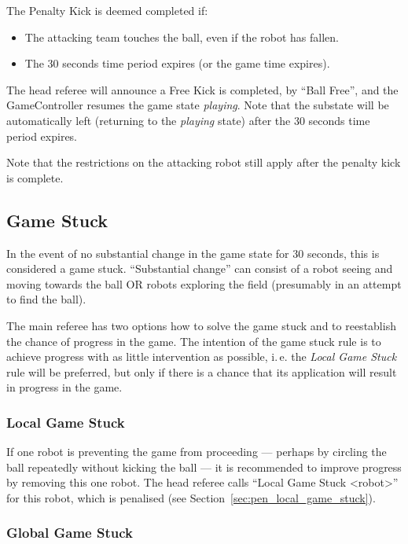 \documentclass[12pt]{article}
\newcommand{\ie}{\mbox{i.\,e.}\xspace}
\newcommand{\cf}{see\xspace}
\newcommand{\PenaltyFreeKickTime}{30 seconds\xspace}
\begin{document}
The Penalty Kick is deemed completed if:
\begin{itemize}
\item The attacking team touches the ball, even if the robot has fallen.
\item The \PenaltyFreeKickTime time period expires (or the game time expires).
\end{itemize}

The head referee will announce a Free Kick is completed, by ``Ball Free'', and the GameController
resumes the game state \emph{playing}. Note that the substate will be automatically left (returning to the \textit{playing} state) after the \PenaltyFreeKickTime time period expires.

Note that the restrictions on the attacking robot still apply after the penalty kick is complete.

\subsection{Game Stuck}
\label{sec:game_stuck}

In the event of no substantial change in the game state for 30 seconds, this is considered a game stuck.  ``Substantial change'' can consist of a robot seeing and moving towards the ball OR robots exploring the field (presumably in an attempt to find the ball).

The main referee has two options how to solve the game stuck and to reestablish the chance of progress in the game. The intention of the game stuck rule is to achieve progress with as little intervention as possible, \ie the \emph{Local Game Stuck} rule will be preferred, but only if there is a chance that its application will result in progress in the game.

\subsubsection{Local Game Stuck}
\label{sec:game_stuck:local}

If one robot is preventing the game from proceeding --- perhaps by circling the ball repeatedly without kicking the ball --- it is recommended to improve progress by removing this one robot.
The head referee calls ``Local Game Stuck \textless robot\textgreater'' for this robot, which is penalised (\cf Section~\ref{sec:pen_local_game_stuck}).

\subsubsection{Global Game Stuck}
\label{sec:game_stuck:global}
\end{document}
